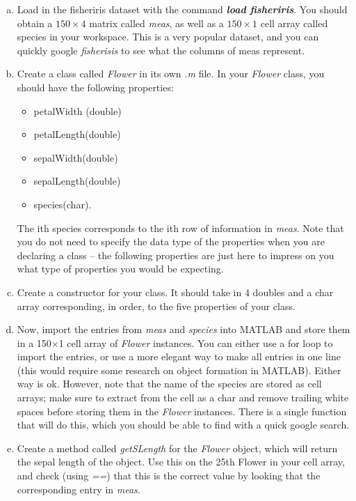 \documentclass[11pt]{article}
\begin{document}
\noindent
\newline
\begin{enumerate}[a.]
	\item  Load in the fisheriris dataset with the command \textbf{\textit{load fisheriris}}.
	You should obtain a $150 \times 4$ matrix called \textit{meas},
	as well as a $150 \times 1$ cell array called species in your workspace.
	This is a very popular dataset, 
	and you can quickly google \textit{fisherisis} to see what the columns of meas represent. 

	\item Create a class called \textit{Flower} in its own \textit{.m} file.
	In your \textit{Flower} class, you should have the following properties:
	\begin{itemize} 
		\item petalWidth (double)
		\item petalLength(double)
		\item sepalWidth(double)
		\item sepalLength(double)
		\item species(char).
	\end{itemize}
	The ith species corresponds to the ith row of information in \textit{meas}.
	Note that you do not need to specify the data type of the properties when
	you are declaring a class – the following properties are just here to impress on you what
	type of properties you would be expecting. 
	
	\item Create a constructor for your class.
	It should take in 4 doubles and a char array corresponding, in order,
	to the five properties of your class.
	
	\item Now, import the entries from \textit{meas} and \textit{species} into MATLAB and
	store them in a 150$\times$1 cell array of \textit{Flower} instances.
	You can either use a for loop to import the entries,
	or use a more elegant way to make all entries in one line
	(this would require some research on object formation in MATLAB).
	Either way is ok.
	However, note that the name of the species are stored as cell arrays;
	make sure to extract from the cell as a char and remove trailing white spaces
	before storing them in the \textit{Flower} instances.
	There is a single function that will do this,
	which you should be able to find with a quick google search.

	\item Create a method called \textit{getSLength} for the \textit{Flower} object,
	which will return the sepal length of the object.
	Use this on the 25th Flower in your cell array, and check (using \textit{==})
	that this is the correct value by looking that the corresponding entry in \textit{meas}.
	

\end{enumerate}
\end{document}
